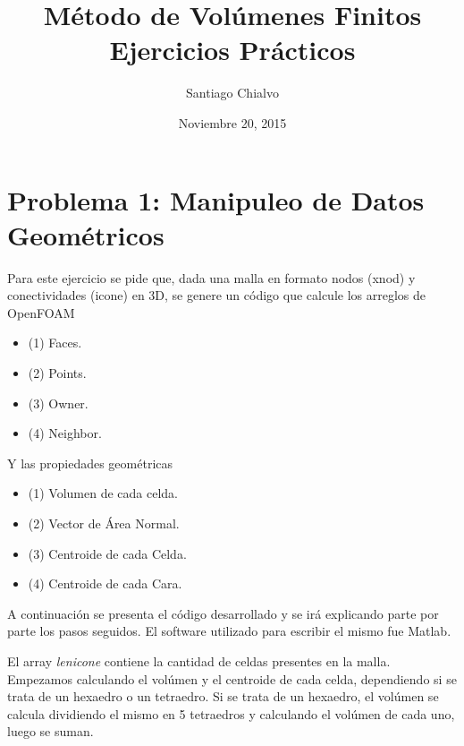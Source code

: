 \documentclass[11pt]{article}
\title{\textbf{M\'etodo de Vol\'umenes Finitos}\\\textbf{Ejercicios Pr\'acticos}}
\author{Santiago Chialvo}
\date{Noviembre 20, 2015}
\begin{document}

\maketitle


\section{Problema 1: Manipuleo de Datos Geom\'etricos}

Para este ejercicio se pide que, dada una malla en formato nodos (xnod) y conectividades (icone) en 3D, se genere un c\'odigo que calcule los arreglos de OpenFOAM

\begin{itemize}
    \item (1) Faces.
    \item (2) Points.
    \item (3) Owner.
    \item (4) Neighbor.
\end{itemize}

Y las propiedades geom\'etricas 

\begin{itemize}
    \item (1) Volumen de cada celda.
    \item (2) Vector de \'Area Normal.
    \item (3) Centroide de cada Celda.
    \item (4) Centroide de cada Cara.
\end{itemize}

\bigskip A continuaci\'on se presenta el c\'odigo desarrollado y se ir\'a explicando parte por parte los pasos seguidos. El software utilizado para escribir el mismo fue Matlab.

\bigskip El array \textit{lenicone} contiene la cantidad de celdas presentes en la malla. Empezamos calculando el vol\'umen y el centroide de cada celda, dependiendo si se trata de un hexaedro o un tetraedro. Si se trata de un hexaedro, el vol\'umen se calcula dividiendo el mismo en 5 tetraedros y calculando el vol\'umen de cada uno, luego se suman.
\end{document}
